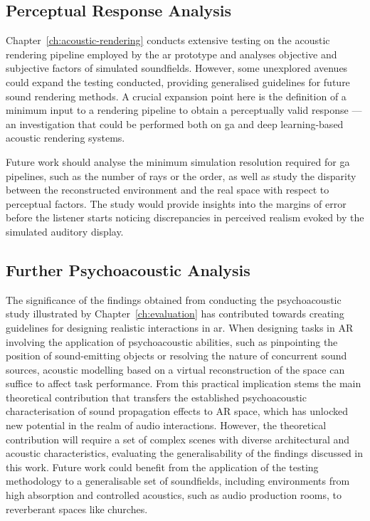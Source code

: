 \subsection{Perceptual Response Analysis}
Chapter~\ref{ch:acoustic-rendering} conducts extensive testing on the acoustic rendering pipeline employed by the \acrshort{ar} prototype and analyses objective and subjective factors of simulated soundfields. However, some unexplored avenues could expand the testing conducted, providing generalised guidelines for future sound rendering methods. A crucial expansion point here is the definition of a minimum input to a rendering pipeline to obtain a perceptually valid response --- an investigation that could be performed both on \acrshort{ga} and deep learning-based acoustic rendering systems.\par
Future work should analyse the minimum simulation resolution required for \acrshort{ga} pipelines, such as the number of rays or the order, as well as study the disparity between the reconstructed environment and the real space with respect to perceptual factors. The study would provide insights into the margins of error before the listener starts noticing discrepancies in perceived realism evoked by the simulated auditory display.\par

\subsection{Further Psychoacoustic Analysis}
The significance of the findings obtained from conducting the psychoacoustic study illustrated by Chapter~\ref{ch:evaluation} has contributed towards creating guidelines for designing realistic interactions in \acrshort{ar}. When designing tasks in AR involving the application of psychoacoustic abilities, such as pinpointing the position of sound-emitting objects or resolving the nature of concurrent sound sources, acoustic modelling based on a virtual reconstruction of the space can suffice to affect task performance. From this practical implication stems the main theoretical contribution that transfers the established psychoacoustic characterisation of sound propagation effects to AR space, which has unlocked new potential in the realm of audio interactions. However, the theoretical contribution will require a set of complex scenes with diverse architectural and acoustic characteristics, evaluating the generalisability of the findings discussed in this work. Future work could benefit from the application of the testing methodology to a generalisable set of soundfields, including environments from high absorption and controlled acoustics, such as audio production rooms, to reverberant spaces like churches.\par

